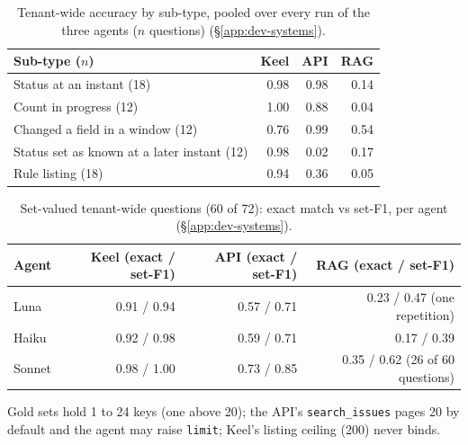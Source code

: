 \documentclass[sigconf, nonacm]{acmart}
\newcommand{\code}[1]{\texttt{#1}}
\begin{document}
\begin{table}[t]
\caption{Tenant-wide accuracy by sub-type, pooled over every run of the three agents ($n$ questions) (\S\ref{app:dev-systems}).}
\label{tab:b5}
\centering
\small
\begin{tabular}{l r r r}
\toprule
Sub-type ($n$) & Keel & API & RAG \\
\midrule
Status at an instant (18) & 0.98 & 0.98 & 0.14 \\
Count in progress (12) & 1.00 & 0.88 & 0.04 \\
Changed a field in a window (12) & 0.76 & 0.99 & 0.54 \\
Status set as known at a later instant (12) & 0.98 & 0.02 & 0.17 \\
Rule listing (18) & 0.94 & 0.36 & 0.05 \\
\bottomrule
\end{tabular}
\end{table}

\begin{table}[t]
\caption{Set-valued tenant-wide questions (60 of 72): exact match vs set-F1, per agent (\S\ref{app:dev-systems}).}
\label{tab:b6}
\centering
\small
\begin{tabular}{l r r r}
\toprule
Agent & Keel (exact / set-F1) & API (exact / set-F1) & RAG (exact / set-F1) \\
\midrule
Luna & 0.91 / 0.94 & 0.57 / 0.71 & 0.23 / 0.47 (one repetition) \\
Haiku & 0.92 / 0.98 & 0.59 / 0.71 & 0.17 / 0.39 \\
Sonnet & 0.98 / 1.00 & 0.73 / 0.85 & 0.35 / 0.62 (26 of 60 questions) \\
\bottomrule
\end{tabular}
\par\vspace{5pt}
\begin{minipage}{\textwidth}
\footnotesize
Gold sets hold 1 to 24 keys (one above 20); the API's \code{search\_issues} pages 20 by default and the agent may raise \code{limit}; Keel's listing ceiling (200) never binds.
\end{minipage}
\end{table}
\end{document}

